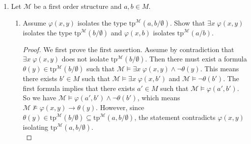 \documentclass{article}
\begin{document}
\begin{enumerate}[label={\bf Q\arabic*:}]
\begin{proof}
      $\Leftarrow$: Assume $[p]=[q]$. By symmetry it suffices to show that
      $p\vdash q$. Let $\phi$ be a formula in $q$. We need to show that
      $p\vdash\phi$. Assume by contradiction that $p\not\vdash\phi$. Then
      $p\cup\{\neg\phi\}$ is consistent. Let $\mathcal{N}$ be an elementary
      extension of $\mathcal{M}$ that realizes $p\not\vdash\phi$; such
      $\mathcal{N}$ exists from Proposition 6.3. Let $p'\supseteq
      p\cup\{\neg\phi\}$ be the Completion of $p\cup\{\neg\phi\}$ by
      including all formulas over $A$ in $n$-variables that are true in
      $\mathcal{N}$. Then $p'\in[q]$ since $p'\in[p]$ and $[p]=[q]$, yet
      $p'$ contains both $\phi$ and $\neg\phi$, contradicting the
      consistency of $p'$.
    \end{proof}

  \item Let $\mathcal{M}$ be a first order structure and $a,b\in M$.
    \begin{enumerate}
      \item Assume $\varphi(x,y)$ isolates the type
        $\text{tp}^{\mathcal{M}}(a,b/\emptyset)$. Show that $\exists
        x\; \varphi(x,y)$ isolates the type
        $\text{tp}^{\mathcal{M}}(b/\emptyset)$ and $\varphi(x,b)$ isolates
        $\text{tp}^{\mathcal{M}}(a/b)$.

        \begin{proof}
          We first prove the first assertion. Assume by contradiction that
          $\exists x\; \varphi(x,y)$ does not isolate
          $\text{tp}^{\mathcal{M}}(b/\emptyset)$. Then there must exist a
          formula $\theta(y)\in\text{tp}^{\mathcal{M}}(b/\emptyset)$ such
          that $\mathcal{M}\models\exists x\;
          \varphi(x,y)\wedge\neg\theta(y)$. This means there exists $b'\in
          M$ such that $\mathcal{M}\models\exists x\; \varphi(x,b')$ and
          $\mathcal{M}\models\neg\theta(b')$. The first formula implies
          that there exists $a'\in M$ such that
          $\mathcal{M}\models\varphi(a',b')$. So we have
          $\mathcal{M}\models\varphi(a',b')\wedge\neg\theta(b')$, which
          means $\mathcal{M}\not\models\varphi(x,y)\rightarrow\theta(y)$.
          However, since
          $\theta(y)\in\text{tp}^{\mathcal{M}}(b/\emptyset)\subseteq
          \text{tp}^{\mathcal{M}}(a,b/\emptyset)$, the statement
          contradicts $\varphi(x,y)$ isolating
          $\text{tp}^{\mathcal{M}}(a,b/\emptyset)$. \\


\end{proof}
\end{enumerate}
\end{enumerate}
\end{document}

